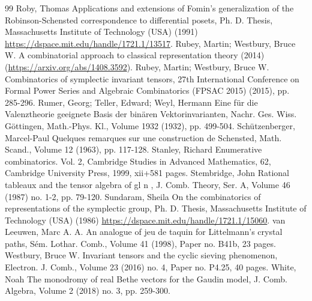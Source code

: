\begin{thebibliography}{99}
 Roby, Thomas Applications and extensions of Fomin’s generalization of the Robinson-Schensted correspondence to differential posets, Ph. D. Thesis, Massachusetts Institute of Technology (USA) (1991) \url{https://dspace.mit.edu/handle/1721.1/13517}.
 Rubey, Martin; Westbury, Bruce W. A combinatorial approach to classical representation theory (2014) (\url{https://arxiv.org/abs/1408.3592}).
 Rubey, Martin; Westbury, Bruce W. Combinatorics of symplectic invariant tensors, 27th International Conference on Formal Power Series and Algebraic Combinatorics (FPSAC 2015) (2015), pp. 285-296.
 Rumer, Georg; Teller, Edward; Weyl, Hermann Eine für die Valenztheorie geeignete Basis der binären Vektorinvarianten, Nachr. Ges. Wiss. Göttingen, Math.-Phys. Kl., Volume 1932 (1932), pp. 499-504.
 Schützenberger, Marcel-Paul Quelques remarques sur une construction de Schensted, Math. Scand., Volume 12 (1963), pp. 117-128.
 Stanley, Richard Enumerative combinatorics. Vol. 2, Cambridge Studies in Advanced Mathematics, 62, Cambridge University Press, 1999, xii+581 pages.
 Stembridge, John Rational tableaux and the tensor algebra of gl n , J. Comb. Theory, Ser. A, Volume 46 (1987) no. 1-2, pp. 79-120.
 Sundaram, Sheila On the combinatorics of representations of the symplectic group, Ph. D. Thesis, Massachusetts Institute of Technology (USA) (1986) \url{https://dspace.mit.edu/handle/1721.1/15060}.
 van Leeuwen, Marc A. A. An analogue of jeu de taquin for Littelmann’s crystal paths, Sém. Lothar. Comb., Volume 41 (1998), Paper no. B41b, 23 pages.
 Westbury, Bruce W. Invariant tensors and the cyclic sieving phenomenon, Electron. J. Comb., Volume 23 (2016) no. 4, Paper no. P4.25, 40 pages.
 White, Noah The monodromy of real Bethe vectors for the Gaudin model, J. Comb. Algebra, Volume 2 (2018) no. 3, pp. 259-300.
\end{thebibliography}
